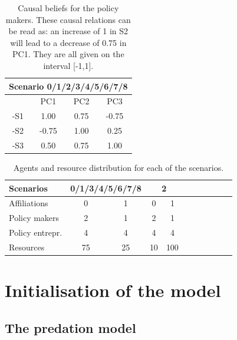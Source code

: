 \documentclass[12pt]{article}
\begin{document}
\begin{table}[h!]
\begin{center}
\begin{tabular}{ |c|c|c|c|}
\hline
\multicolumn{4}{|c|}{ {\bfseries Scenario 0/1/2/3/4/5/6/7/8}}	
								\\ \hline \hline
	& PC1	& PC2	& PC3		\\ \hline
-S1 	& 1.00	& 0.75	&-0.75		\\ \hline
-S2 	&-0.75	& 1.00	& 0.25 		\\ \hline
-S3 	& 0.50	& 0.75	& 1.00		\\ 
\hline
\end{tabular}
\end{center}
\caption{Causal beliefs for the policy makers. These causal relations can be read as: an increase of 1 in S2 will lead to a decrease of 0.75 in PC1. They are all given on the interval [-1,1].}
\label{tab:causalBeliefs}
\end{table}

\begin{table}[h!]
\begin{center}
\begin{tabular}{ |l||c|c||c|c||c|c||c|c||c|c| } 
\hline
 {\bfseries Scenarios}
 				& \multicolumn{2}{|c||}{ {\bfseries 0/1/3/4/5/6/7/8}}	
						& \multicolumn{2}{|c||}{ {\bfseries 2}}	
														\\ \hline \hline
Affiliations			& 0	& 1	& 0	& 1		\\ \hline
Policy makers 		& 2	& 1	& 2	& 1		\\ \hline
Policy entrepr.		& 4	& 4	& 4	& 4		\\ \hline
Resources		& 75	& 25	& 10	& 100	\\ \hline
\end{tabular}
\end{center}
\caption{Agents and resource distribution for each of the scenarios.}
\label{tab:agentResourceDistribution}
\end{table}


\section{Initialisation of the model}
\label{sec:initialisation}

\subsection{The predation model}
\end{document}
